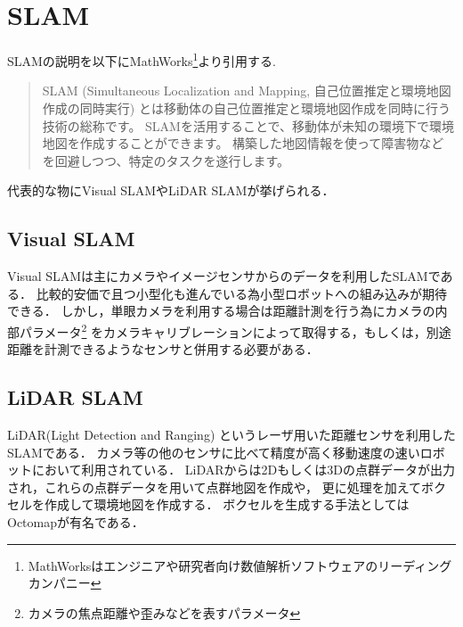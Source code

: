 \section{SLAM}
\label{slam}
SLAMの説明を以下にMathWorks\footnote{MathWorksはエンジニアや研究者向け数値解析ソフトウェアのリーディングカンパニー}より引用する.

\begin{quotation}
SLAM (Simultaneous Localization and Mapping, 自己位置推定と環境地図作成の同時実行) とは移動体の自己位置推定と環境地図作成を同時に行う技術の総称です。
SLAMを活用することで、移動体が未知の環境下で環境地図を作成することができます。
構築した地図情報を使って障害物などを回避しつつ、特定のタスクを遂行します。
\end{quotation}

代表的な物にVisual SLAMやLiDAR SLAMが挙げられる．\cite{slam_mathwork}

\subsection{Visual SLAM}
Visual SLAMは主にカメラやイメージセンサからのデータを利用したSLAMである．
比較的安価で且つ小型化も進んでいる為小型ロボットへの組み込みが期待できる．
しかし，単眼カメラを利用する場合は距離計測を行う為にカメラの内部パラメータ\footnote{カメラの焦点距離や歪みなどを表すパラメータ}
をカメラキャリブレーションによって取得する，もしくは，別途距離を計測できるようなセンサと併用する必要がある．

\subsection{LiDAR SLAM}
LiDAR(Light Detection and Ranging) というレーザ用いた距離センサを利用したSLAMである．
カメラ等の他のセンサに比べて精度が高く移動速度の速いロボットにおいて利用されている．
LiDARからは2Dもしくは3Dの点群データが出力され，これらの点群データを用いて点群地図を作成や，
更に処理を加えてボクセルを作成して環境地図を作成する．
ボクセルを生成する手法としてはOctomap\cite{Octomap}が有名である．
